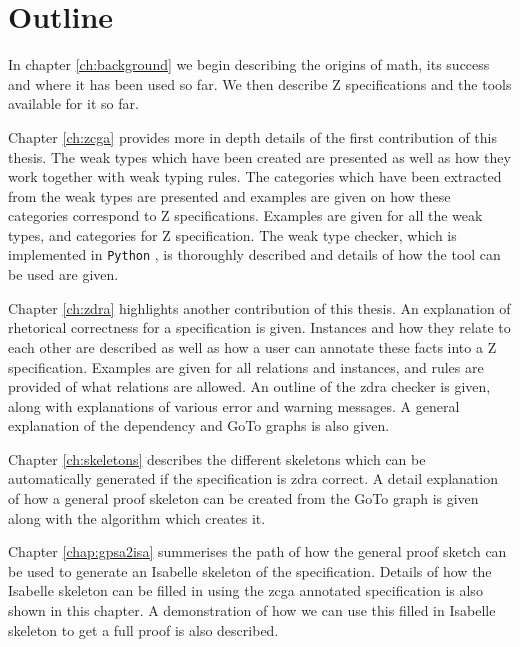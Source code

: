 \section{Outline}

In chapter \ref{ch:background} we begin describing the origins of \gls{math}, its success and where it has been used so far. We then describe Z specifications and the tools available for it so far.


Chapter \ref{ch:zcga} provides more in depth details of the first contribution of this thesis. The weak types which have been created are presented as well as how they work together with weak typing rules. The categories which have been extracted from the weak types are presented and examples are given on how these categories correspond to Z specifications. Examples are given for all the weak types, and categories for Z specification. The weak type checker, which is implemented in \texttt{Python} \cite{Python}, is thoroughly described and details of how the tool can be used are given.

Chapter \ref{ch:zdra} highlights another contribution of this thesis. An explanation of rhetorical correctness for a specification is given. Instances and how they relate to each other are described as well as how a user can annotate these facts into a Z specification. Examples are given for all relations and instances, and rules are provided of what relations are allowed. An outline of the \gls{zdra} checker is given, along with explanations of various error and warning messages. A general explanation of the dependency and GoTo graphs is also given.

Chapter \ref{ch:skeletons} describes the different skeletons which can be automatically generated if the specification is \gls{zdra} correct. A detail explanation of how a general proof skeleton can be created from the GoTo graph is given along with the algorithm which creates it. 

Chapter \ref{chap:gpsa2isa} summerises the path of how the general proof sketch can be used to generate an Isabelle skeleton of the specification. Details of how the Isabelle skeleton can be filled in using the \gls{zcga} annotated specification is also shown in this chapter. A demonstration of how we can use this filled in Isabelle skeleton to get a full proof is also described.

